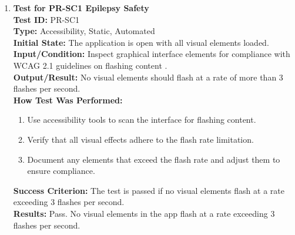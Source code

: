 \documentclass[12pt, titlepage]{article}
\begin{document}
\begin{enumerate}
    \item \textbf{Test for PR-SC1 Epilepsy Safety} \\
      \newline
      \textbf{Test ID:} PR-SC1 \\
      \textbf{Type:} Accessibility, Static, Automated \\
      \textbf{Initial State:} The application is open with all visual elements loaded. \\
      \textbf{Input/Condition:} Inspect graphical interface elements for compliance with WCAG 2.1 guidelines on flashing content 
      \citep*{WCAG21}. \\
      \textbf{Output/Result:} No visual elements should flash at a rate of more than 3 flashes per second. \\
      \textbf{How Test Was Performed:}
      \begin{enumerate}
          \item Use accessibility tools to scan the interface for flashing content.
          \item Verify that all visual effects adhere to the flash rate limitation.
          \item Document any elements that exceed the flash rate and adjust them to ensure compliance.
      \end{enumerate}
      \textbf{Success Criterion:} The test is passed if no visual elements flash at a rate exceeding 3 flashes per second.\\
      \textbf{Results:} Pass. No visual elements in the app flash at a rate exceeding 3 flashes per second.\\


\end{enumerate}
\end{document}

